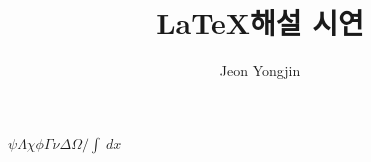 \documentclass{article}
\author{Jeon Yongjin}
\title{\LaTeX 해설 시연}
\date{}
\begin{document}
\maketitle


\( \psi\varLambda \chi \phi \Gamma \nu \Delta \Omega / \int_{}^{}  \,dx  \)
\end{document}
